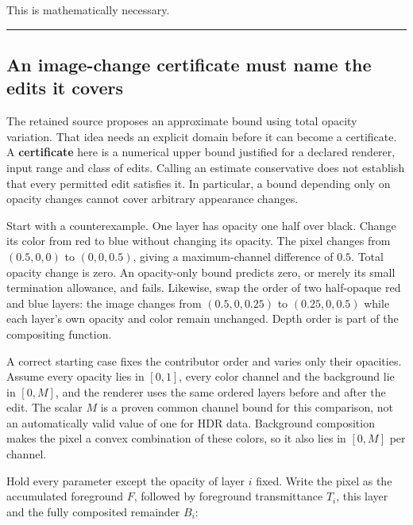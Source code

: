 This is mathematically necessary.

\begin{center}\rule{0.5\linewidth}{0.5pt}\end{center}

\subsection{An image-change certificate must name the edits it covers}\label{06-engine-ii-ch045-an-image-change-certificate-must-name-the-edits-it-covers}

\hypertarget{06-engine-ii-ch045-an-image-change-certificate-must-name-the-edits-it-covers}{}

The retained source proposes an approximate bound using total opacity variation. That idea needs an explicit domain before it can become a certificate. A \textbf{certificate} here is a numerical upper bound justified for a declared renderer, input range and class of edits. Calling an estimate conservative does not establish that every permitted edit satisfies it. In particular, a bound depending only on opacity changes cannot cover arbitrary appearance changes.

Start with a counterexample. One layer has opacity one half over black. Change its color from red to blue without changing its opacity. The pixel changes from \((0.5,0,0)\) to \((0,0,0.5)\), giving a maximum-channel difference of \(0.5\). Total opacity change is zero. An opacity-only bound predicts zero, or merely its small termination allowance, and fails. Likewise, swap the order of two half-opaque red and blue layers: the image changes from \((0.5,0,0.25)\) to \((0.25,0,0.5)\) while each layer's own opacity and color remain unchanged. Depth order is part of the compositing function.

A correct starting case fixes the contributor order and varies only their opacities. Assume every opacity lies in \([0,1]\), every color channel and the background lie in \([0,M]\), and the renderer uses the same ordered layers before and after the edit. The scalar \(M\) is a proven common channel bound for this comparison, not an automatically valid value of one for HDR data. Background composition makes the pixel a convex combination of these colors, so it also lies in \([0,M]\) per channel.

Hold every parameter except the opacity of layer \(i\) fixed. Write the pixel as the accumulated foreground \(F\), followed by foreground transmittance \(T_i\), this layer and the fully composited remainder \(B_i\):

